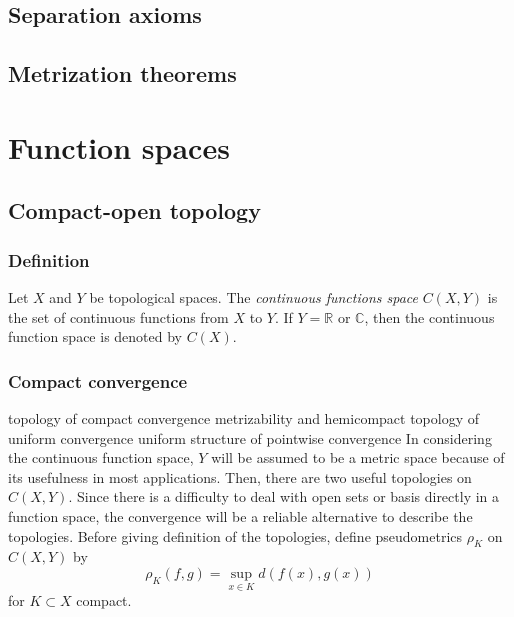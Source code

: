 \documentclass{../crs}
\begin{document}
\section{Separation axioms}
\section{Metrization theorems}









\chapter{Function spaces}




\section{Compact-open topology}

\subsection{Definition}

\begin{defn}
Let $X$ and $Y$ be topological spaces.
The \emph{continuous functions space} $C(X,Y)$ is the set of continuous functions from $X$ to $Y$.
If $Y=\mathbb{R}$ or $\mathbb{C}$, then the continuous function space is denoted by $C(X)$.
\end{defn}

\subsection{Compact convergence}
topology of compact convergence
metrizability and hemicompact
topology of uniform convergence
uniform structure of pointwise convergence
In considering the continuous function space, $Y$ will be assumed to be a metric space because of its usefulness in most applications.
Then, there are two useful topologies on $C(X,Y)$.
Since there is a difficulty to deal with open sets or basis directly in a function space, the convergence will be a reliable alternative to describe the topologies.
Before giving definition of the topologies, define pseudometrics $\rho_K$ on $C(X,Y)$ by
\[\rho_K(f,g)=\sup_{x\in K}d(f(x),g(x))\]
for $K\subset X$ compact.
\end{document}

